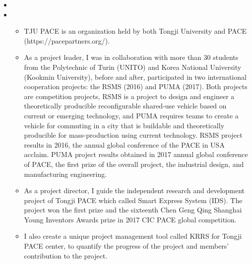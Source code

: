   \begin{itemize}[leftmargin=*]
  	\item{}
  	
  	
    \item{}
    {\small\begin{itemize}
        \item {TJU PACE is an organization held by both Tongji University and PACE (https://pacepartners.org/).}
        \item {As a project leader, I was in collaboration with more than 30 students from the Polytechnic of Turin (UNITO) and Korea National University (Kookmin University), before and after, participated in two international cooperation projects: the RSMS (2016) and PUMA (2017). Both projects are competition projects, RSMS is a project to design and engineer a theoretically producible reconfigurable shared-use vehicle based on current or emerging technology, and PUMA requires teams to create a vehicle for commuting in a city that is buildable and theoretically producible for mass-production using current technology. RSMS project results in 2016, the annual global conference of the PACE in USA acclaim. PUMA project results obtained in 2017 annual global conference of PACE, the first prize of the overall project, the industrial design, and manufacturing engineering.}
        \item {As a project director, I guide the independent research and development project of Tongji PACE which called Smart Express System (IDS). The project won the first prize and the sixteenth Chen Geng Qing Shanghai Young Inventors Awards prize in 2017 CIC PACE global competition.}
        \item{I also create a unique project management tool called KRRS for Tongji PACE center, to quantify the progress of the project and members' contribution to the project.}
	    \end{itemize}}
	    
  \end{itemize}